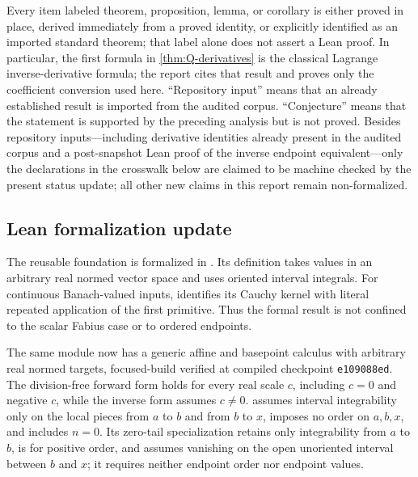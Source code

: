 \documentclass[11pt,oneside]{article}
\theoremstyle{definition}
\theoremstyle{remark}
\newcommand{\1}{\mathbf 1}
\begin{document}
\begin{statusbox}
Every item labeled theorem, proposition, lemma, or corollary is either proved
in place, derived immediately from a proved identity, or explicitly identified
as an imported standard theorem; that label alone does not assert a Lean
proof.  In particular, the first formula in \cref{thm:Q-derivatives} is the
classical Lagrange inverse-derivative formula; the report cites that result and
proves only the coefficient conversion used here.  ``Repository input'' means
that an already established result is imported from the audited corpus.
``Conjecture'' means that the statement is supported by the preceding analysis
but is not proved.  Besides repository inputs---including derivative identities
already present in the audited corpus and a post-snapshot Lean proof of the
inverse endpoint equivalent---only the declarations in the crosswalk below are
claimed to be machine checked by the present status update; all other new
claims in this report remain non-formalized.
\end{statusbox}

\subsection{Lean formalization update}
The reusable foundation is formalized in
.  Its definition
 takes values in an arbitrary real normed vector
space and uses oriented interval integrals.  For continuous Banach-valued
inputs,
 identifies its Cauchy
kernel with literal repeated application of the first primitive.  Thus the
formal result is not confined to the scalar Fabius case or to ordered
endpoints.

The same module now has a generic affine and basepoint calculus with arbitrary
real normed targets, focused-build verified at compiled checkpoint
\texttt{e109088ed}.  The division-free forward form
 holds for every real scale \(c\), including
\(c=0\) and negative \(c\), while the inverse form
 assumes \(c\ne0\).
 assumes interval integrability
only on the local pieces from \(a\) to \(b\) and from \(b\) to \(x\), imposes
no order on \(a,b,x\), and includes \(n=0\).  Its zero-tail specialization
 retains only integrability
from \(a\) to \(b\), is for positive order, and assumes vanishing on
the open unoriented interval between \(b\) and \(x\); it requires neither
endpoint order nor endpoint values.
\end{document}
